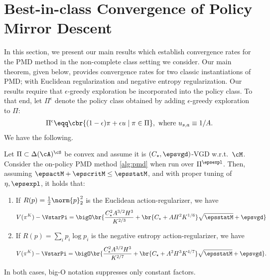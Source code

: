 \section{Best-in-class Convergence of Policy Mirror Descent}
In this section, we present our main results which establish convergence rates for the PMD method in the non-complete class setting we consider. 
Our main theorem, given below, provides convergence rates for two classic instantiations of PMD; with Euclidean regularization and negative entropy regularization.
Our results require that $\epsilon$-greedy exploration be incorporated into the policy class.
To that end, let $\Pi^\epsilon$ denote the policy class obtained by adding $\epsilon$-greedy exploration to $\Pi$:
\begin{align*}
    \Pi^\epsilon \eqq \cbr{(1-\epsilon)\pi + \epsilon u \mid \pi \in \Pi},
    \text{ where }u_{s, a} \equiv 1/A.
\end{align*}
We have the following.
\begin{theorem}\label{thm:pmd_main}
    Let $\Pi\subset \Delta(\cA)^\cS$ be convex and assume it is $(C_\star, \epsvgd)$-VGD w.r.t.~$\cM$. 
    Consider the on-policy PMD method \cref{alg:pmd}  when run over $\Pi^\epsexpl$.
    Then, assuming $\epsactM + \epscritM \leq \epsstatM$, and with proper tuning of $\eta, \epsexpl$, it holds that:
    
    \begin{enumerate}[label=\roman*.] 
        \item If $R(p) = \frac12\norm{p}_2^2$ is the Euclidean action-regularizer, we have  
        \begin{align*}
            V(\pi^K) - \VstarPi=
            \bigO\br{
            \frac{C_\star^2 A^{3/2} H^3}{K^{2/3}}
            + \br{C_\star + A H^2 K^{1/6}}\sqrt{\epsstatM}
            + \epsvgd}
        \end{align*}

        \item If $R(p) = \sum_i p_i\log p_i$ is the negative entropy action-regularizer, we have  
        \begin{align*}
            V(\pi^K) - \VstarPi=
            \bigO\br{
                \frac{C_\star^2 A^{3/2} H^3 }{K^{2/7}}
                + \br{C_\star + A^2 H^3 K^{4/7}}\sqrt{\epsstatM} 
                + \epsvgd}.
        \end{align*}
        
    \end{enumerate}
    In both cases, 
    big-O notation suppresses only constant factors.
\end{theorem}
